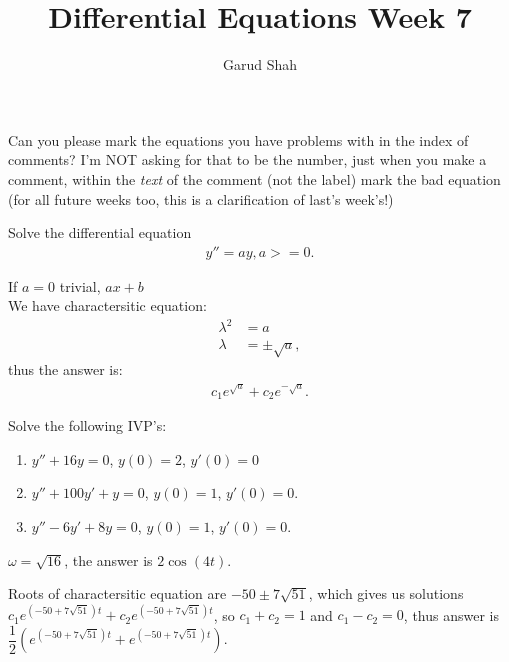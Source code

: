 \documentclass[11pt]{article}
\title{Differential Equations Week \textbf{7}}
\author{Garud Shah}
\begin{document}
    \maketitle 
    Can you please mark the equations you have problems with in the index of comments? I'm NOT asking for that to be the number, just when you make a comment, within the \textit{text} of the comment (not the label)
    mark the bad equation (for all future weeks too, this is a clarification of last's week's!)\newpage
    \begin{problem}[Problem 1]
        Solve the differential equation
        \begin{align}
            y'' = ay, a>=0.
        \end{align}
    \end{problem}
    \begin{solution*}
        If $a=0$ trivial, $ax+b$\\
        We have charactersitic equation:
        \begin{align}
            \lambda^2 &= a \\
            \lambda &= \pm \sqrt{a},
        \end{align}
        thus the answer is:
        \begin{align}
            c_1e^{\sqrt{a}} + c_2e^{-\sqrt{a}}.
        \end{align}
    \end{solution*}
    \begin{problem}[Problem 2]
        Solve the following IVP's:
        \begin{enumerate}
            \item $y''+16y=0$, $y(0)=2$, $y'(0)=0$
            \item $y''+100y'+y=0$, $y(0)=1$, $y'(0)=0$.
            \item $y''-6y'+8y=0$, $y(0)=1$, $y'(0)=0$.
        \end{enumerate}
    \end{problem}
    \begin{solution}[Solution 2a]
        $\omega = \sqrt{16}$, the answer is $2\cos(4t)$.
    \end{solution}
    \begin{solution}[Solution 2b]
        Roots of charactersitic equation are $-50 \pm 7\sqrt{51}$, which gives us solutions $c_1e^{(-50+7\sqrt{51})t} + c_2e^{(-50+7\sqrt{51})t}$, so $c_1 +c_2 = 1$ and $c_1 - c_2 = 0$, thus answer is $\dfrac{1}{2} \left(e^{(-50+7\sqrt{51})t} + e^{(-50+7\sqrt{51})t}\right)$.
    \end{solution}
\end{document}
